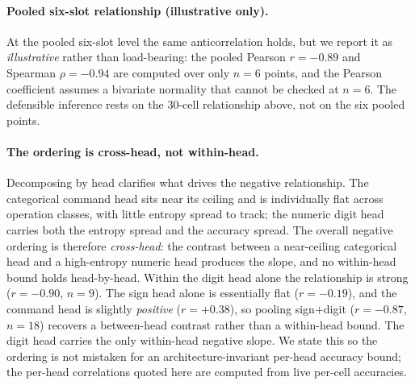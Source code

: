 \documentclass[entropy,article,submit,moreauthors,pdftex]{Definitions/mdpi}
\begin{document}
\paragraph{Pooled six-slot relationship (illustrative only).} At the pooled six-slot level the same anticorrelation holds, but we report it as \emph{illustrative} rather than load-bearing: the pooled Pearson $r=-0.89$ and Spearman $\rho=-0.94$ are computed over only $n=6$ points, and the Pearson coefficient assumes a bivariate normality that cannot be checked at $n=6$. The defensible inference rests on the $30$-cell relationship above, not on the six pooled points.

\paragraph{The ordering is cross-head, not within-head.} Decomposing by head clarifies what drives the negative relationship. The categorical command head sits near its ceiling and is individually flat across operation classes, with little entropy spread to track; the numeric digit head carries both the entropy spread and the accuracy spread. The overall negative ordering is therefore \emph{cross-head}: the contrast between a near-ceiling categorical head and a high-entropy numeric head produces the slope, and no within-head bound holds head-by-head. Within the digit head alone the relationship is strong ($r=-0.90$, $n=9$). The sign head alone is essentially flat ($r=-0.19$), and the command head is slightly \emph{positive} ($r=+0.38$), so pooling sign$+$digit ($r=-0.87$, $n=18$) recovers a between-head contrast rather than a within-head bound. The digit head carries the only within-head negative slope. We state this so the ordering is not mistaken for an architecture-invariant per-head accuracy bound; the per-head correlations quoted here are computed from live per-cell accuracies.
\end{document}
